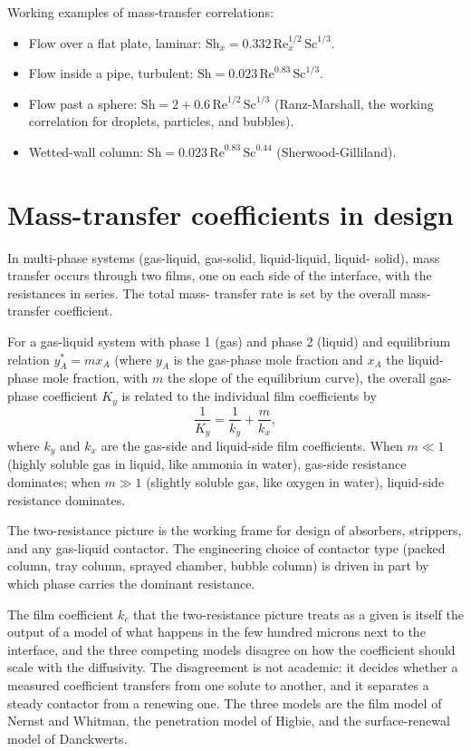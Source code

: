 Working examples of mass-transfer correlations:

\begin{itemize}[leftmargin=*]
  \item Flow over a flat plate, laminar: $\text{Sh}_x = 0.332\,
    \text{Re}_x^{1/2}\,\text{Sc}^{1/3}$.
  \item Flow inside a pipe, turbulent: $\text{Sh} = 0.023\,
    \text{Re}^{0.83}\,\text{Sc}^{1/3}$.
  \item Flow past a sphere: $\text{Sh} = 2 + 0.6\,\text{Re}^{1/2}\,
    \text{Sc}^{1/3}$ (Ranz-Marshall, the working correlation for
    droplets, particles, and bubbles).
  \item Wetted-wall column: $\text{Sh} = 0.023\,\text{Re}^{0.83}\,
    \text{Sc}^{0.44}$ (Sherwood-Gilliland).
\end{itemize}

\section{Mass-transfer coefficients in design}

In multi-phase systems (gas-liquid, gas-solid, liquid-liquid, liquid-
solid), mass transfer occurs through two films, one on each side of
the interface, with the resistances in series. The total mass-
transfer rate is set by the overall mass-transfer coefficient.

For a gas-liquid system with phase 1 (gas) and phase 2 (liquid) and
equilibrium relation $y_A^* = m x_A$ (where $y_A$ is the gas-phase
mole fraction and $x_A$ the liquid-phase mole fraction, with $m$ the
slope of the equilibrium curve), the overall gas-phase coefficient
$K_y$ is related to the individual film coefficients by
\[
\frac{1}{K_y} = \frac{1}{k_y} + \frac{m}{k_x},
\]
where $k_y$ and $k_x$ are the gas-side and liquid-side film
coefficients. When $m \ll 1$ (highly soluble gas in liquid, like
ammonia in water), gas-side resistance dominates; when $m \gg 1$
(slightly soluble gas, like oxygen in water), liquid-side resistance
dominates.



The two-resistance picture is the working frame for design of
absorbers, strippers, and any gas-liquid contactor. The engineering
choice of contactor type (packed column, tray column, sprayed
chamber, bubble column) is driven in part by which phase carries the
dominant resistance.

 The film
coefficient $k_c$ that the two-resistance picture treats as a given is
itself the output of a model of what happens in the few hundred microns
next to the interface, and the three competing models disagree on how the
coefficient should scale with the diffusivity. The disagreement is not
academic: it decides whether a measured coefficient transfers from one
solute to another, and it separates a steady contactor from a renewing
one. The three models are the film model of Nernst and Whitman, the
penetration model of Higbie, and the surface-renewal model of Danckwerts.

